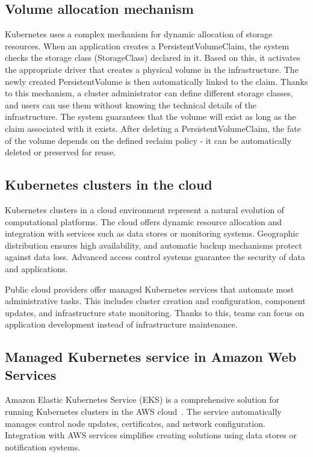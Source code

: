 \subsection{Volume allocation mechanism}
Kubernetes uses a complex mechanism for dynamic allocation of storage resources.
When an application creates a PersistentVolumeClaim, the system checks the storage class (StorageClass) declared in it.
Based on this, it activates the appropriate driver that creates a physical volume in the infrastructure.
The newly created PersistentVolume is then automatically linked to the claim.
Thanks to this mechanism, a cluster administrator can define different storage classes, and users can use them without knowing the technical details of the infrastructure.
The system guarantees that the volume will exist as long as the claim associated with it exists.
After deleting a PersistentVolumeClaim, the fate of the volume depends on the defined reclaim policy - it can be automatically deleted or preserved for reuse.

\subsection{Kubernetes clusters in the cloud}

Kubernetes clusters in a cloud environment represent a natural evolution of computational platforms.
The cloud offers dynamic resource allocation and integration with services such as data stores or monitoring systems.
Geographic distribution ensures high availability, and automatic backup mechanisms protect against data loss.
Advanced access control systems guarantee the security of data and applications.

Public cloud providers offer managed Kubernetes services that automate most administrative tasks.
This includes cluster creation and configuration, component updates, and infrastructure state monitoring.
Thanks to this, teams can focus on application development instead of infrastructure maintenance.

\subsection{Managed Kubernetes service in Amazon Web Services}

Amazon Elastic Kubernetes Service (EKS) is a comprehensive solution for running Kubernetes clusters in the AWS cloud~\cite{amazon_eks}.
The service automatically manages control node updates, certificates, and network configuration.
Integration with AWS services simplifies creating solutions using data stores or notification systems.

